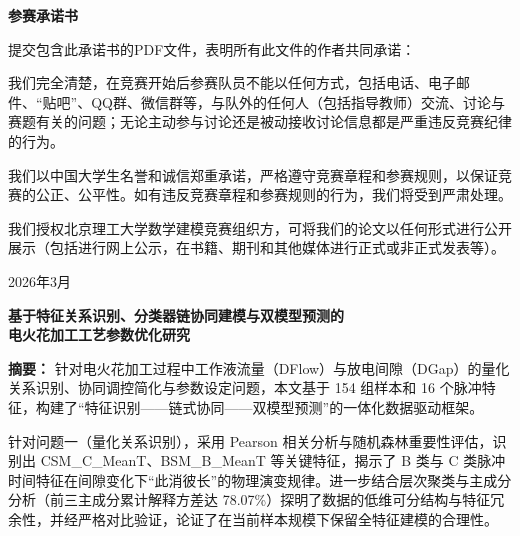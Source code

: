 \documentclass[UTF8,a4paper,12pt]{ctexart}
\begin{document}
\begin{titlepage}
\thispagestyle{empty}
\begin{center}
    {\bfseries 参赛承诺书\par}
    \vspace{2cm}
    \begin{minipage}{0.88\textwidth}
    \linespread{1.5}\selectfont
    提交包含此承诺书的PDF文件，表明所有此文件的作者共同承诺：

    \vspace{1em}
    我们完全清楚，在竞赛开始后参赛队员不能以任何方式，包括电话、电子邮件、“贴吧”、QQ群、微信群等，与队外的任何人（包括指导教师）交流、讨论与赛题有关的问题；无论主动参与讨论还是被动接收讨论信息都是严重违反竞赛纪律的行为。

    \vspace{1em}
    我们以中国大学生名誉和诚信郑重承诺，严格遵守竞赛章程和参赛规则，以保证竞赛的公正、公平性。如有违反竞赛章程和参赛规则的行为，我们将受到严肃处理。

    \vspace{1em}
    我们授权北京理工大学数学建模竞赛组织方，可将我们的论文以任何形式进行公开展示（包括进行网上公示，在书籍、期刊和其他媒体进行正式或非正式发表等）。
    \end{minipage}
    \vfill
    { 2026年3月\par}
\end{center}
\end{titlepage}

\clearpage
\setcounter{page}{1}
\begin{center}
{\bfseries 基于特征关系识别、分类器链协同建模与双模型预测的\\电火花加工工艺参数优化研究\par}
\end{center}

\vspace{1.0em}
\noindent\textbf{摘要：}
针对电火花加工过程中工作液流量（DFlow）与放电间隙（DGap）的量化关系识别、协同调控简化与参数设定问题，本文基于 154 组样本和 16 个脉冲特征，构建了“特征识别——链式协同——双模型预测”的一体化数据驱动框架。

针对问题一（量化关系识别），采用 Pearson 相关分析与随机森林重要性评估，识别出 CSM_C_MeanT、BSM_B_MeanT 等关键特征，揭示了 B 类与 C 类脉冲时间特征在间隙变化下“此消彼长”的物理演变规律。进一步结合层次聚类与主成分分析（前三主成分累计解释方差达 78.07\%）探明了数据的低维可分结构与特征冗余性，并经严格对比验证，论证了在当前样本规模下保留全特征建模的合理性。
\end{document}
